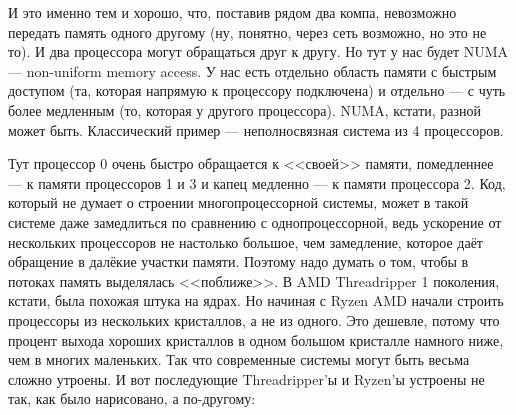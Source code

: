 \documentclass{article}
\begin{document}
    И это именно тем и хорошо, что, поставив рядом два компа, невозможно передать память одного другому (ну, понятно, через сеть возможно, но это не то). И два процессора могут обращаться друг к другу. Но тут у нас будет NUMA --- non-uniform memory access. У нас есть отдельно область памяти с быстрым доступом (та, которая напрямую к процессору подключена) и отдельно --- с чуть более медленным (то, которая у другого процессора). NUMA, кстати, разной может быть. Классический пример --- неполносвязная система из 4 процессоров.
    \begin{center}
    \end{center}
    Тут процессор 0 очень быстро обращается к <<своей>> памяти, помедленнее --- к памяти процессоров 1 и 3 и капец медленно --- к памяти процессора 2. Код, который не думает о строении многопроцессорной системы, может в такой системе даже замедлиться по сравнению с однопроцессорной, ведь ускорение от нескольких процессоров не настолько большое, чем замедление, которое даёт обращение в далёкие участки памяти. Поэтому надо думать о том, чтобы в потоках память выделялась <<поближе>>. В AMD Threadripper 1 поколения, кстати, была похожая штука на ядрах. Но начиная с Ryzen AMD начали строить процессоры из нескольких кристаллов, а не из одного. Это дешевле, потому что процент выхода хороших кристаллов в одном большом кристалле намного ниже, чем в многих маленьких. Так что современные системы могут быть весьма сложно утроены. И вот последующие Threadripper'ы и Ryzen'ы устроены не так, как было нарисовано, а по-другому:
\end{document}
